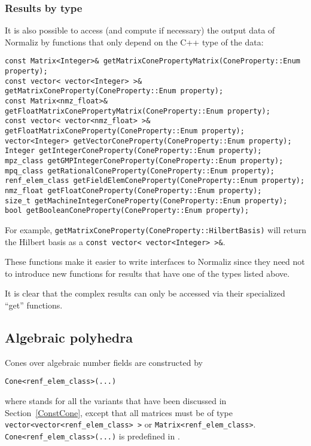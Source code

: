 \begin{small}
\subsubsection{Results by type}\label{ByType}

It is also possible to access (and compute if necessary) the output data of Normaliz by functions that only depend on the C++ type of the data:

\begin{Verbatim}
const Matrix<Integer>& getMatrixConePropertyMatrix(ConeProperty::Enum property);
const vector< vector<Integer> >& getMatrixConeProperty(ConeProperty::Enum property);
const Matrix<nmz_float>& getFloatMatrixConePropertyMatrix(ConeProperty::Enum property);
const vector< vector<nmz_float> >& getFloatMatrixConeProperty(ConeProperty::Enum property);
vector<Integer> getVectorConeProperty(ConeProperty::Enum property);
Integer getIntegerConeProperty(ConeProperty::Enum property);
mpz_class getGMPIntegerConeProperty(ConeProperty::Enum property);
mpq_class getRationalConeProperty(ConeProperty::Enum property);
renf_elem_class getFieldElemConeProperty(ConeProperty::Enum property);
nmz_float getFloatConeProperty(ConeProperty::Enum property);
size_t getMachineIntegerConeProperty(ConeProperty::Enum property);
bool getBooleanConeProperty(ConeProperty::Enum property);
\end{Verbatim}

For example, \verb|getMatrixConeProperty(ConeProperty::HilbertBasis)| will return the Hilbert basis as a \verb|const vector< vector<Integer> >&|.

These functions make it easier to write interfaces to Normaliz since they need not to introduce new functions for results that have one of the types listed above.

It is clear that the complex results can only be accessed via their specialized ``get'' functions.

\subsection{Algebraic polyhedra}

Cones over algebraic number fields are constructed by
\begin{Verbatim}
Cone<renf_elem_class>(...)
\end{Verbatim}
where  stands for all the variants that have been discussed in Section~\ref{ConstCone}, except that all matrices must be of type \verb+vector<vector<renf_elem_class> >+ or \verb+Matrix<renf_elem_class>+. \verb|Cone<renf_elem_class>(...)| is predefined in .


\end{small}
